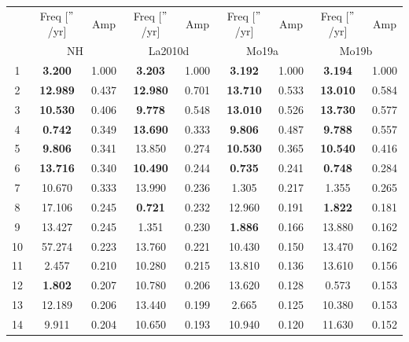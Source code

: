 \documentclass[12pt]{article}
\begin{document}
	\begin{table}[t]
		\begin{tabular}{ccccccccc}
			\hline
			
			{}                     & Freq [$"$/yr]           & Amp                & Freq [$"$/yr]          & Amp                    & Freq [$"$/yr]                   & Amp                    & Freq [$"$/yr]         & Amp                    \\
			{}              & \multicolumn{2}{c}{NH}            & \multicolumn{2}{c}{La2010d}                         & \multicolumn{2}{c}{Mo19a}                         & \multicolumn{2}{c}{Mo19b}                        
			\\ \hline
			
			1 & \textbf{3.200} & 1.000 & \textbf{3.203} & 1.000 & \textbf{3.192} & 1.000 & \textbf{3.194} & 1.000 \\
			2 & \textbf{12.989} & 0.437 & \textbf{12.980} & 0.701 & \textbf{13.710} & 0.533 & \textbf{13.010} & 0.584 \\
			3 & \textbf{10.530} & 0.406 & \textbf{9.778} & 0.548 & \textbf{13.010} & 0.526 & \textbf{13.730} & 0.577 \\
			4 &  \textbf{0.742} & 0.349  & \textbf{13.690} & 0.333 & \textbf{9.806} & 0.487 & \textbf{9.788} & 0.557 \\
			5 & \textbf{9.806} & 0.341   & 13.850 & 0.274 & \textbf{10.530} & 0.365 & \textbf{10.540} & 0.416 \\
			6 & \textbf{13.716} & 0.340 & \textbf{10.490} & 0.244 & \textbf{0.735} & 0.241 & \textbf{0.748} & 0.284 \\
			7 &  10.670 			& 0.333& 13.990 & 0.236 & 1.305 & 0.217 & 1.355 & 0.265 \\
			8 & 17.106 & 0.245 & \textbf{0.721} & 0.232 & 12.960 & 0.191 & \textbf{1.822} & 0.181 \\
			9 & 13.427 & 0.245 & 1.351 & 0.230 & \textbf{1.886} & 0.166 & 13.880 & 0.162 \\
			10 & 57.274 & 0.223  & 13.760 & 0.221 & 10.430 & 0.150 & 13.470 & 0.162 \\
			11 & 2.457 & 0.210& 10.280 & 0.215 & 13.810 & 0.136 & 13.610 & 0.156 \\
			12 &\textbf{1.802} & 0.207  & 10.780 & 0.206 & 13.620 & 0.128 & 0.573 & 0.153 \\
			13 &   12.189 & 0.206 & 13.440 & 0.199 & 2.665 & 0.125 & 10.380 & 0.153 \\
			14 &  9.911 & 0.204& 10.650 & 0.193 & 10.940 & 0.120 & 11.630 & 0.152 \\

\end{tabular}
\end{table}
\end{document}

